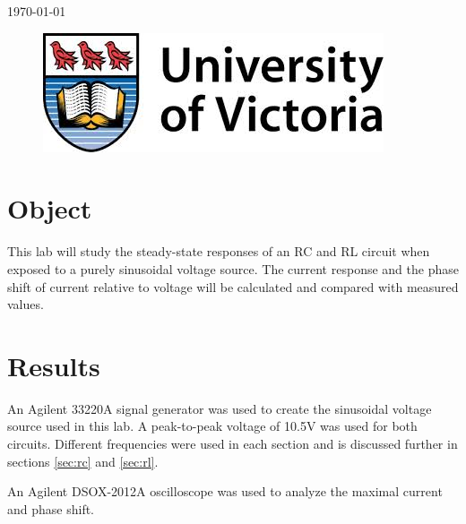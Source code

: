 \documentclass[12pt]{article}
\begin{document}
\begin{titlepage}
{\large \today}\\ %

\begin{figure}[b]	 %
	\centering
	\includegraphics[scale=0.3]{UVic_logo}
\end{figure}

\end{titlepage}





\section{Object}\label{sec:object}
This lab will study the steady-state responses of an RC and RL circuit when exposed to a purely sinusoidal voltage source. The current response and the phase shift of current relative to voltage will be calculated and compared with measured values.

\section{Results}\label{sec:results}
An Agilent 33220A signal generator was used to create the sinusoidal voltage source used in this lab. A peak-to-peak voltage of 10.5V was used for both circuits. Different frequencies were used in each section and is discussed further in sections \ref{sec:rc} and \ref{sec:rl}.

An Agilent DSOX-2012A oscilloscope was used to analyze the maximal current and phase shift.
\end{document}
